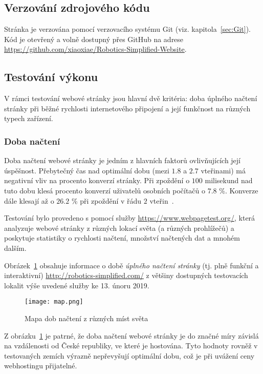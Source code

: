 \documentclass[a4paper, 12pt]{article}
\newcommand*{\fullref}[1]{\hyperref[{#1}]{\ref*{#1}}}
\begin{document}
  \subsection{Verzování zdrojového kódu}
  Stránka je verzována pomocí verzovacího systému Git (viz. kapitola~\fullref{sec:Git}). Kód je otevřený a volně dostupný přes GitHub na adrese \url{https://github.com/xiaoxiae/Robotics-Simplified-Website}.


  \subsection{Testování výkonu}
  V rámci testování webové stránky jsou hlavní dvě kritéria: doba úplného načtení stránky při běžné rychlosti internetového připojení a její funkčnost na různých typech zařízení. %


  \subsubsection{Doba načtení}
  Doba načtení webové stránky je jedním z hlavních faktorů ovlivňujících její úspěšnost. Přebytečný čas nad optimální dobu (mezi $1.8$ a $2.7$ vteřinami) má negativní vliv na procento konverzí stránky. Při zpoždění o $100$ milisekund nad tuto dobu klesá procento konverzí uživatelů osobních počítačů o $7.8$ \%. Konverze dále klesají až o $26.2$ \% při zpoždění v řádu $2$ vteřin~\cite{conversion-rate-statistics}.

  Testování bylo provedeno s pomocí služby \url{https://www.webpagetest.org/}, která analyzuje webové stránky z různých lokací světa (a různých prohlížečů) a poskytuje statistiky o rychlosti načtení, množství načtených dat a mnohém dalším.

  Obrázek~\ref{img:Mapa dob načtení z různých míst světa} obsahuje informace o době \emph{úplného načtení stránky} (tj. plně funkční a interaktivní) \url{http://robotics-simplified.com/} z většiny dostupných testovacích lokalit výše uvedené služby ke 13. únoru 2019.

  \begin{figure}[H]
    \texttt{[image: map.png]}
    \caption{Mapa dob načtení z různých míst světa} \label{img:Mapa dob načtení z různých míst světa}
  \end{figure}

  Z obrázku~\ref{img:Mapa dob načtení z různých míst světa} je patrné, že doba načtení webové stránky je do značné míry závislá na vzdálenosti od České republiky, ve které je hostována. Tyto hodnoty rovněž v testovaných zemích výrazně nepřevyšují optimální dobu, což je při uvážení ceny webhostingu přijatelné.
\end{document}
